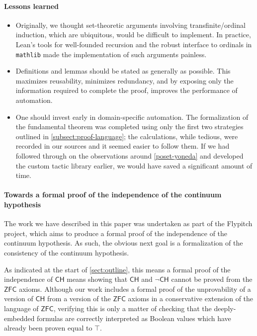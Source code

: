 \documentclass[a4paper,USenglish,cleveref, autoref]{lipics-v2019}
\theoremstyle{definition}
\begin{document}
\paragraph*{Lessons learned}
\begin{itemize}
\item Originally, we thought set-theoretic arguments involving transfinite/ordinal induction, which are ubiquitous, would be difficult to implement. In practice, Lean's tools for well-founded recursion and the robust interface to ordinals in \lstinline{mathlib} made the implementation of such arguments painless.
\item Definitions and lemmas should be stated as generally as possible. This maximizes reusability, minimizes redundancy, and by exposing only the information required to complete the proof, improves the performance of automation.

\item One should invest early in domain-specific automation. The formalization of the fundamental theorem was completed using only the first two strategies outlined in \autoref{subsect:proof-language}; the calculations, while tedious, were recorded in our sources and it seemed easier to follow them. If we had followed through on the observations around \autoref{poset-yoneda} and developed the custom tactic library earlier, we would have saved a significant amount of time.
\end{itemize}

\paragraph*{Towards a formal proof of the independence of the continuum hypothesis}

The work we have described in this paper was undertaken as part of the Flypitch project, which aims to produce a formal proof of the independence of the continuum hypothesis. As such, the obvious next goal is a formalization of the consistency of the continuum hypothesis.

As indicated at the start of \autoref{sect:outline}, this means a formal proof of the independence of $\mathsf{CH}$ means showing that $\mathsf{CH}$ and $\neg\mathsf{CH}$ cannot be proved from the $\mathsf{ZFC}$ axioms. Although our work includes a formal proof of the unprovability of a version of $\mathsf{CH}$ from a version of the $\mathsf{ZFC}$ axioms in a conservative extension of the language of $\mathsf{ZFC}$, verifying this is only a matter of checking that the deeply-embedded formulas are correctly interpreted as Boolean values which have already been proven equal to $\top$.
\end{document}
